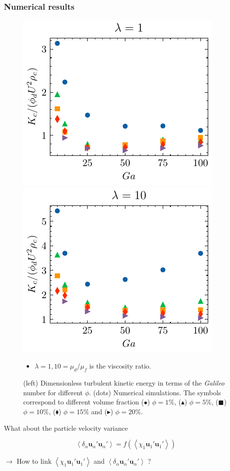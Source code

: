 \documentclass{sintefbeamer}
\newcommand{\avg}[1]{\left<#1\right>}
\newcommand{\pavg}[1]{\left<\delta_\alpha #1\right>}
\begin{document}
\begin{frame}
  \frametitle{Numerical results}

  \begin{figure}[h!]
    \centering
    \includegraphics[height=0.3\textwidth]{image/HOMOGENEOUS/fCA/Tf_l_1.pdf}
    \includegraphics[height=0.3\textwidth]{image/HOMOGENEOUS/fCA/Tf_l_10.pdf}
    \caption{(left) Dimensionless turbulent kinetic energy in terms of the \textit{Galileo} number for different $\phi$. (dots) Numerical simulations.
    The symbols correspond to different volume fraction ($\bullet$) $\phi = 1\%$, ($\blacktriangle$) $\phi = 5\%$, ($\blacksquare$) $\phi = 10\%$, ($\blacklozenge$) $\phi = 15\%$ and ($\blacktriangleright$) $\phi = 20\%$.}
    \label{fig:Tf_Bf}

    \begin{itemize}
      \item $\lambda = 1,10 = \mu_d/\mu_f$ is the viscosity ratio. 
    \end{itemize}
\end{figure}

\end{frame}
\begin{frame}
  {What about the particle velocity variance }

  \begin{equation*}
    \pavg{\textbf{u}_\alpha'\textbf{u}_\alpha'}
    = f(\avg{\chi_1 \textbf{u}_1'\textbf{u}_1'})
\end{equation*}

\vfill

$\to$ How to link $ \avg{\chi_1 \textbf{u}_1'\textbf{u}_1'}$ and $\pavg{\textbf{u}_\alpha' \textbf{u}_\alpha'}$ ?
\end{frame}
\end{document}
